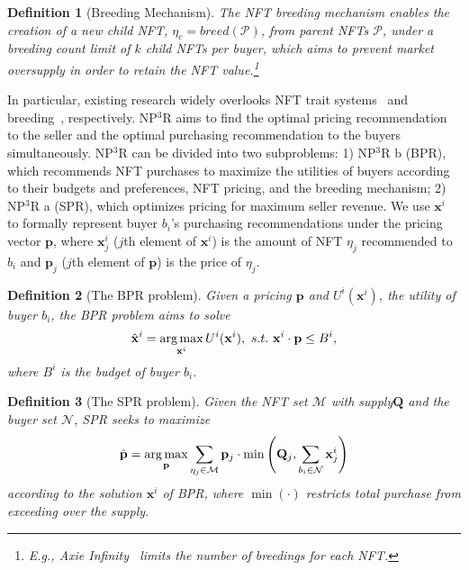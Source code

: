 \documentclass[conference]{IEEEtran}
\theoremstyle{plain}
\newtheorem{definition}{Definition}
\DeclareMathOperator*{\argmax}{arg\,max}
\begin{document}
\begin{definition}[Breeding Mechanism]
    \label{def:nft-breeding}
    The NFT breeding mechanism enables the creation of a new child NFT, $\eta_c = breed(\mathcal{P})$, from parent NFTs $\mathcal{P}$, under a breeding count limit of $k$ child NFTs per buyer, which aims to prevent market oversupply in order to retain the NFT value.\footnote{E.g., Axie Infinity~\cite{axieinfinity} limits the number of breedings for each NFT.}
\end{definition}
In particular, existing research widely overlooks NFT trait systems~\cite{he2020lightgcn, yang2021consisrec} and breeding~\cite{costa2023show, kapoor2022tweetboost, piyadigama2022analysis}, respectively. NP$^3$R aims to find the optimal pricing recommendation to the seller and the optimal purchasing recommendation to the buyers simultaneously. NP$^3$R can be divided into two subproblems: 1) NP$^3$R b (BPR), which recommends NFT purchases to maximize the utilities of buyers according to their budgets and preferences, NFT pricing, and the breeding mechanism; 2) NP$^3$R a (SPR), which optimizes pricing for maximum seller revenue. We use $\mathbf{x}^i$ to formally represent buyer $b_i$'s purchasing recommendations under the pricing vector $\mathbf{p}$, where $\mathbf{x}^i_j$ ($j$th element of $\mathbf{x}^i$) is the amount of NFT $\eta_j$ recommended to $b_i$ and $\mathbf{p}_j$ ($j$th element of $\mathbf{p}$) is the price of $\eta_j$. 

\begin{definition}[The BPR problem]
\label{def:problemb}
    Given a pricing $\mathbf{p}$ and $U^i(\mathbf{x}^i)$, the utility of buyer $b_i$, the BPR problem aims to solve
    \begin{equation}\small
        \label{eqn:argmax-buyer-demand}
        \hat{\mathbf{x}}^i = \argmax_{\mathbf{x}^i}U^i(\mathbf{x}^i),\,\,s.t.\,\,\mathbf{x}^i\cdot\mathbf{p}\leq B^i,
    \end{equation}
    where $B^i$ is the budget of buyer $b_i$.
\end{definition}
\begin{definition}[The SPR problem]
\label{def:problema}
    Given the NFT\xspace set $\mathcal{M}$ with supply\xspace $\mathbf{Q}$ and the buyer set $\mathcal{N}$, SPR seeks to maximize
    \begin{equation}\small
        \hat{\mathbf{p}} = \argmax_\mathbf{p} \sum_{\eta_j\in\mathcal{M}} \mathbf{p}_j \cdot \min\left(\mathbf{Q}_j, \sum_{b_i\in\mathcal{N}}\mathbf{x}^i_j\right)
    \end{equation}
    according to the solution ${\mathbf{x}^i}$ of BPR, where $\min(\cdot)$ restricts total purchase from exceeding over the supply.

\end{definition} 
\end{document}
